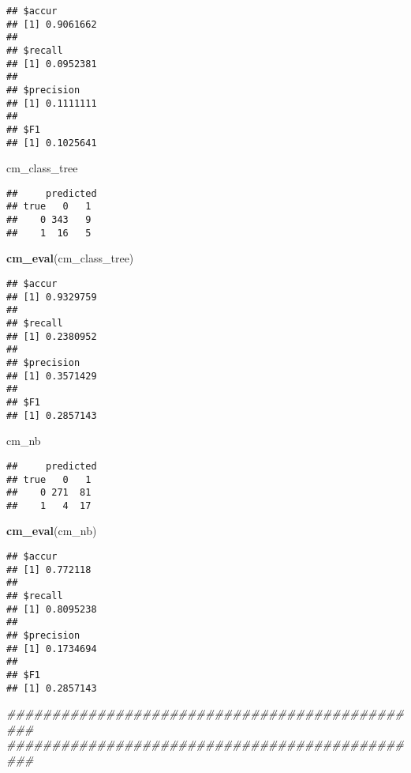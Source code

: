 \documentclass[
]{article}
\newenvironment{Shaded}{\begin{snugshade}}{\end{snugshade}}
\newcommand{\CommentTok}[1]{\textcolor[rgb]{0.56,0.35,0.01}{\textit{#1}}}
\newcommand{\KeywordTok}[1]{\textcolor[rgb]{0.13,0.29,0.53}{\textbf{#1}}}
\newcommand{\NormalTok}[1]{#1}
\begin{document}
\begin{verbatim}
## $accur
## [1] 0.9061662
## 
## $recall
## [1] 0.0952381
## 
## $precision
## [1] 0.1111111
## 
## $F1
## [1] 0.1025641
\end{verbatim}

\begin{Shaded}
\begin{Highlighting}[]
\NormalTok{cm_class_tree}
\end{Highlighting}
\end{Shaded}

\begin{verbatim}
##     predicted
## true   0   1
##    0 343   9
##    1  16   5
\end{verbatim}

\begin{Shaded}
\begin{Highlighting}[]
\KeywordTok{cm_eval}\NormalTok{(cm_class_tree)}
\end{Highlighting}
\end{Shaded}

\begin{verbatim}
## $accur
## [1] 0.9329759
## 
## $recall
## [1] 0.2380952
## 
## $precision
## [1] 0.3571429
## 
## $F1
## [1] 0.2857143
\end{verbatim}

\begin{Shaded}
\begin{Highlighting}[]
\NormalTok{cm_nb }
\end{Highlighting}
\end{Shaded}

\begin{verbatim}
##     predicted
## true   0   1
##    0 271  81
##    1   4  17
\end{verbatim}

\begin{Shaded}
\begin{Highlighting}[]
\KeywordTok{cm_eval}\NormalTok{(cm_nb)}
\end{Highlighting}
\end{Shaded}

\begin{verbatim}
## $accur
## [1] 0.772118
## 
## $recall
## [1] 0.8095238
## 
## $precision
## [1] 0.1734694
## 
## $F1
## [1] 0.2857143
\end{verbatim}

\begin{Shaded}
\begin{Highlighting}[]
\CommentTok{###############################################}
\CommentTok{###############################################}
\end{Highlighting}
\end{Shaded}
\end{document}

